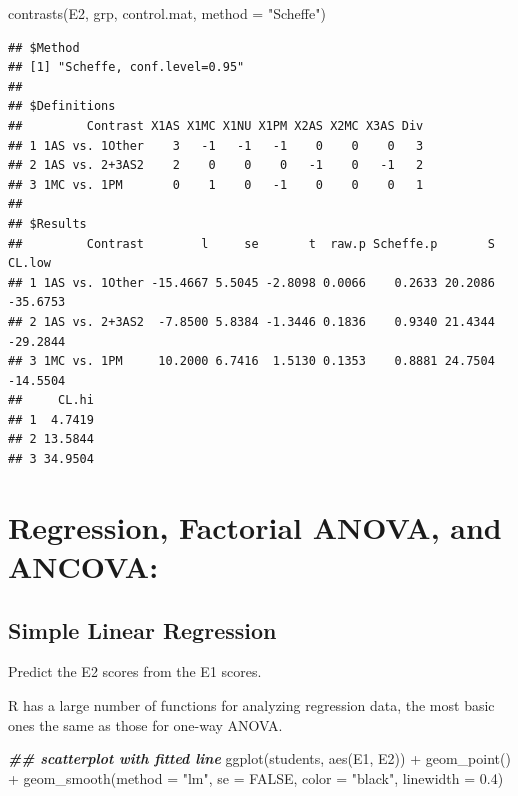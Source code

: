 \documentclass[
]{book}
\newenvironment{Shaded}{\begin{snugshade}}{\end{snugshade}}
\newcommand{\AttributeTok}[1]{\textcolor[rgb]{0.77,0.63,0.00}{#1}}
\newcommand{\ConstantTok}[1]{\textcolor[rgb]{0.00,0.00,0.00}{#1}}
\newcommand{\DocumentationTok}[1]{\textcolor[rgb]{0.56,0.35,0.01}{\textbf{\textit{#1}}}}
\newcommand{\FloatTok}[1]{\textcolor[rgb]{0.00,0.00,0.81}{#1}}
\newcommand{\FunctionTok}[1]{\textcolor[rgb]{0.00,0.00,0.00}{#1}}
\newcommand{\NormalTok}[1]{#1}
\newcommand{\SpecialCharTok}[1]{\textcolor[rgb]{0.00,0.00,0.00}{#1}}
\newcommand{\StringTok}[1]{\textcolor[rgb]{0.31,0.60,0.02}{#1}}
\begin{document}
\begin{Shaded}
\begin{Highlighting}[]
\FunctionTok{contrasts}\NormalTok{(E2, grp, control.mat, }\AttributeTok{method =} \StringTok{"Scheffe"}\NormalTok{)}
\end{Highlighting}
\end{Shaded}

\begin{verbatim}
## $Method
## [1] "Scheffe, conf.level=0.95"
## 
## $Definitions
##         Contrast X1AS X1MC X1NU X1PM X2AS X2MC X3AS Div
## 1 1AS vs. 1Other    3   -1   -1   -1    0    0    0   3
## 2 1AS vs. 2+3AS2    2    0    0    0   -1    0   -1   2
## 3 1MC vs. 1PM       0    1    0   -1    0    0    0   1
## 
## $Results
##         Contrast        l     se       t  raw.p Scheffe.p       S   CL.low
## 1 1AS vs. 1Other -15.4667 5.5045 -2.8098 0.0066    0.2633 20.2086 -35.6753
## 2 1AS vs. 2+3AS2  -7.8500 5.8384 -1.3446 0.1836    0.9340 21.4344 -29.2844
## 3 1MC vs. 1PM     10.2000 6.7416  1.5130 0.1353    0.8881 24.7504 -14.5504
##     CL.hi
## 1  4.7419
## 2 13.5844
## 3 34.9504
\end{verbatim}

\hypertarget{regression-ancova}{%
\section{Regression, Factorial ANOVA, and ANCOVA:}\label{regression-ancova}}

\hypertarget{simple-linear-regression}{%
\subsection{Simple Linear Regression}\label{simple-linear-regression}}

Predict the E2 scores from the E1 scores.

R has a large number of functions for analyzing regression data, the most basic ones the same as those for one-way ANOVA.

\begin{Shaded}
\begin{Highlighting}[]
\DocumentationTok{\#\# scatterplot with fitted line}
\FunctionTok{ggplot}\NormalTok{(students, }\FunctionTok{aes}\NormalTok{(E1, E2)) }\SpecialCharTok{+}
  \FunctionTok{geom\_point}\NormalTok{() }\SpecialCharTok{+}
  \FunctionTok{geom\_smooth}\NormalTok{(}\AttributeTok{method =} \StringTok{"lm"}\NormalTok{, }\AttributeTok{se =} \ConstantTok{FALSE}\NormalTok{, }\AttributeTok{color =} \StringTok{"black"}\NormalTok{, }\AttributeTok{linewidth =} \FloatTok{0.4}\NormalTok{)}
\end{Highlighting}
\end{Shaded}
\end{document}
